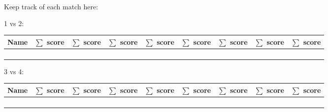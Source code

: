 \documentclass{article}
\begin{document}
Keep track of each match here:

\begin{center}
    1 vs 2: 
    \begin{tabular}{r|c|c|c|c|c|c|c|c}
        \toprule
        Name      & \(\sum\) score & \(\sum\) score & \(\sum\) score & \(\sum\) score & \(\sum\) score & \(\sum\) score & \(\sum\) score & \(\sum\) score\\
        \midrule
                  &                &                &                &                &                &                &                & \\
                  &                &                &                &                &                &                &                & \\
        \midrule
                  &                &                &                &                &                &                &                & \\
                  &                &                &                &                &                &                &                & \\
        \bottomrule
    \end{tabular}
\end{center}

\begin{center}
    3 vs 4:
    \begin{tabular}{r|c|c|c|c|c|c|c|c}
        \toprule
        Name      & \(\sum\) score & \(\sum\) score & \(\sum\) score & \(\sum\) score & \(\sum\) score & \(\sum\) score & \(\sum\) score & \(\sum\) score\\
        \midrule
                  &                &                &                &                &                &                &                & \\
                  &                &                &                &                &                &                &                & \\
        \midrule
                  &                &                &                &                &                &                &                & \\
                  &                &                &                &                &                &                &                & \\
        \bottomrule
    \end{tabular}
\end{center}
\end{document}
